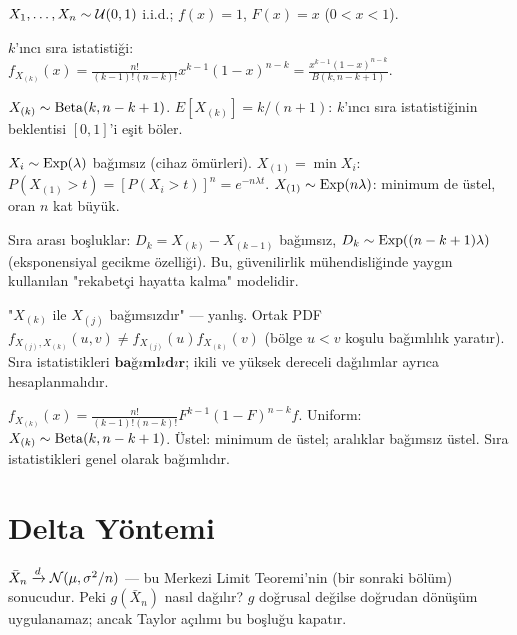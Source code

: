 \begin{ornek}
$X_1, \ldots, X_n \sim \mathcal{U}(0,1)$ i.i.d.; $f(x) = 1$, $F(x) = x$ ($0<x<1$).

$k$'ıncı sıra istatistiği:
$f_{X_{(k)}}(x) = \frac{n!}{(k-1)!(n-k)!} x^{k-1}(1-x)^{n-k} = \frac{x^{k-1}(1-x)^{n-k}}{B(k, n-k+1)}$.

$X_{(k)} \sim \operatorname{Beta}(k, n-k+1)$.
$E[X_{(k)}] = k/(n+1)$: $k$'ıncı sıra istatistiğinin beklentisi $[0,1]$'i eşit böler.
\end{ornek}

\begin{ornek}
$X_i \sim \operatorname{Exp}(\lambda)$ bağımsız (cihaz ömürleri). $X_{(1)} = \min X_i$:
$P(X_{(1)} > t) = [P(X_i > t)]^n = e^{-n\lambda t}$.
$X_{(1)} \sim \operatorname{Exp}(n\lambda)$: minimum de üstel, oran $n$ kat büyük.

Sıra arası boşluklar: $D_k = X_{(k)} - X_{(k-1)}$ bağımsız,
$D_k \sim \operatorname{Exp}((n-k+1)\lambda)$ (eksponensiyal gecikme özelliği).
Bu, güvenilirlik mühendisliğinde yaygın kullanılan "rekabetçi hayatta kalma" modelidir.
\end{ornek}

\begin{hataanalizi}
"$X_{(k)}$ ile $X_{(j)}$ bağımsızdır" --- yanlış.
Ortak PDF $f_{X_{(j)},X_{(k)}}(u,v) \neq f_{X_{(j)}}(u) f_{X_{(k)}}(v)$
(bölge $u < v$ koşulu bağımlılık yaratır).
Sıra istatistikleri $\mathbf{bağımlıdır}$; ikili ve yüksek dereceli dağılımlar ayrıca hesaplanmalıdır.
\end{hataanalizi}

\begin{mikroozet}
$f_{X_{(k)}}(x) = \frac{n!}{(k-1)!(n-k)!}F^{k-1}(1-F)^{n-k}f$.
Uniform: $X_{(k)} \sim \operatorname{Beta}(k, n-k+1)$.
Üstel: minimum de üstel; aralıklar bağımsız üstel.
Sıra istatistikleri genel olarak bağımlıdır.
\end{mikroozet}

\section{Delta Yöntemi}
\label{sec:delta_yontemi}

\begin{motivasyon}
$\bar{X}_n \xrightarrow{d} \mathcal{N}(\mu, \sigma^2/n)$ --- bu Merkezi Limit Teoremi'nin (bir sonraki
bölüm) sonucudur. Peki $g(\bar{X}_n)$ nasıl dağılır? $g$ doğrusal değilse doğrudan
dönüşüm uygulanamaz; ancak Taylor açılımı bu boşluğu kapatır.
\end{motivasyon}

